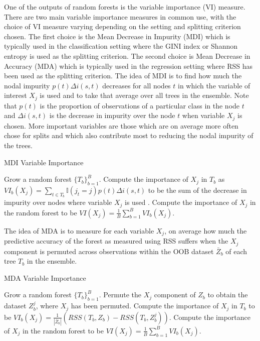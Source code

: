 \documentclass[12pt,twoside]{reedthesis}
\theoremstyle{definition}
\theoremstyle{definition}
\theoremstyle{definition}
\theoremstyle{remark}
\begin{document}
One of the outputs of random forests is the variable importance (VI)
measure. There are two main variable importance measures in common use,
with the choice of VI measure varying depending on the setting and
splitting criterion chosen. The first choice is the Mean Decrease in
Impurity (MDI) which is typically used in the classification setting
where the GINI index or Shannon entropy is used as the splitting
criterion. The second choice is Mean Decrease in Accuracy (MDA) which is
typically used in the regression setting where RSS has been used as the
splitting criterion. The idea of MDI is to find how much the nodal
impurity \(p(t)\Delta i(s,t)\) decreases for all nodes \(t\) in which
the variable of interest \(X_j\) is used and to take that average over
all trees in the ensemble. Note that \(p(t)\) is the proportion of
observations of a particular class in the node \(t\) and
\(\Delta i(s,t)\) is the decrease in impurity over the node \(t\) when
variable \(X_j\) is chosen. More important variables are those which are
on average more often chose for splits and which also contribute most to
reducing the nodal impurity of the trees. \par
\begin{algorithm}
        \caption{MDI Variable Importance}\label{mdi variable importance}
        \begin{algorithmic}[1]
            \State Grow a random forest $\{T_b\}_{b=1}^B$.
                \State Compute the importance of $X_j$ in $T_b$ as $VI_b(X_j)=\sum_{t\in T_b} \mathbb{I}(j_t=j)p(t)\Delta i(s,t)$ to be the sum of the decrease in impurity over nodes where variable $X_j$ is used .
                \EndFor
                \State Compute the importance of $X_j$ in the random forest to be $VI(X_j)=\frac{1}{B}\sum_{b=1}^B VI_b(X_j).$
            \EndFor
        \end{algorithmic}
    \end{algorithm}
The idea of MDA is to measure for each variable \(X_j\), on average how
much the predictive accuracy of the forest as measured using RSS suffers
when the \(X_j\) component is permuted across observations within the
OOB dataset \(\bar{Z}_b\) of each tree \(T_b\) in the ensemble. \par
\begin{algorithm}
        \caption{MDA Variable Importance}\label{mda variable importance}
        \begin{algorithmic}[1]
            \State Grow a random forest $\{T_b\}_{b=1}^B$.
            \State Permute the $X_j$ component of $Z_b$ to obtain the dataset $Z_b^j$, where $X_j$ has been permuted.
            \State Compute the importance of $X_j$ in $T_b$ to be $VI_b(X_j)=\frac{1}{|\bar{Z}_b|}(RSS(T_b,Z_b)-RSS(T_b,Z_b^j)).$
            \EndFor
            \State Compute the importance of $X_j$ in the random forest to be $VI(X_j)=\frac{1}{B}\sum_{b=1}^B VI_b(X_j).$
            \EndFor
        \end{algorithmic}
    \end{algorithm}
\end{document}
